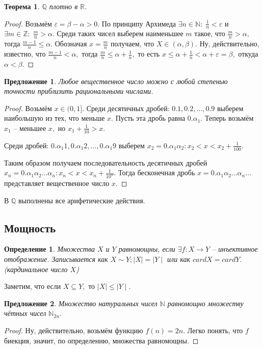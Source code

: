 \documentclass{article}
\newtheorem{Proposition}{Предложение}[section]
\newtheorem{Theorem}{Теорема}[section]
\newtheorem{Definition}{Определение}[section]
\begin{document}
\begin{Theorem}
$\mathbb{Q}$ плотно в $\mathbb{R}.$
\end{Theorem}
\begin{proof}
Возьмём $\varepsilon = \beta - \alpha > 0.$ По принципу Архимеда $\exists n\in \mathbb{N}: \; \frac{1}{n}<\varepsilon$ и $\exists m\in\mathbb{Z}: \; \frac{m}{n} >\alpha.$ Среди таких чисел выберем наименьшее $m$ такое, что $\frac{m}{n}>\alpha,$ тогда $\frac{m-1}{n}\leq \alpha.$ Обозначая $x=\frac{m}{n}$ получаем, что $X\in(\alpha,\beta).$ Ну, действительно, известно, что $\frac{m-1}{n}<\alpha,$ тогда $\frac{m}{n}\leq\alpha+\frac{1}{n},$ то есть $x\leq \alpha+
\frac{1}{n}<\alpha+\varepsilon=\beta,$ откуда $\alpha < \beta.$
\end{proof}

\begin{Proposition}
Любое вещественное число можно с любой степенью точности приблизить рациональными числами. 
\end{Proposition}
\begin{proof}
Возьмём $x\in(0,1].$ Среди десятичных дробей: $0.1, 0.2,\ldots, 0.9$ выберем наибольшую из тех, что меньше $x.$ Пусть эта дробь равна $0.\alpha_1.$ Теперь возьмём $x_1$ -- меньшее $x,$ но $x_1+\frac{1}{10}>x.$
\smallskip

Среди дробей: $0.\alpha_1 1, 0.\alpha_1 2,\ldots, 0.\alpha_1 9$ выберем $x_2=0.\alpha_1\alpha_2: x_2<x<x_2+\frac{1}{100}.$ 
\smallskip

Таким образом получаем последовательность десятичных дробей $x_n=0.\alpha_1\alpha_2\ldots\alpha_n: x_n<x<x_n+\frac{1}{10^n}.$ Тогда бесконечная дробь $x=0.\alpha_1\alpha_2\ldots\alpha_n\ldots$ представляет вещественное число $x.$
\end{proof}

В $\mathbb{Q}$ выполнены все арифетические действия.
\subsection{Мощность}
\begin{Definition}
Множества $X$ и $Y$ равномощны, если $\exists f:X\rightarrow Y$ -- инъективное отображение. Записывается как $X\sim Y; \mid X\mid=\mid Y\mid$ или как $cardX=cardY.$ (\textit{кардинальное число $X$})
\end{Definition}

Заметим, что если $X\subseteq Y,$ то $\mid X\mid \leq\mid Y\mid.$\\

\begin{Proposition}
Множество натуральных чисел $\mathbb{N}$ равномощно множеству чётных чисел $\mathbb{N}_{2n}.$
\end{Proposition}
\begin{proof}
Ну, действительно, возьмём функцию $f(n)=2n.$ Легко понять, что $f$ биекция, значит, по определению, множества равномощны.
\end{proof}
\end{document}

